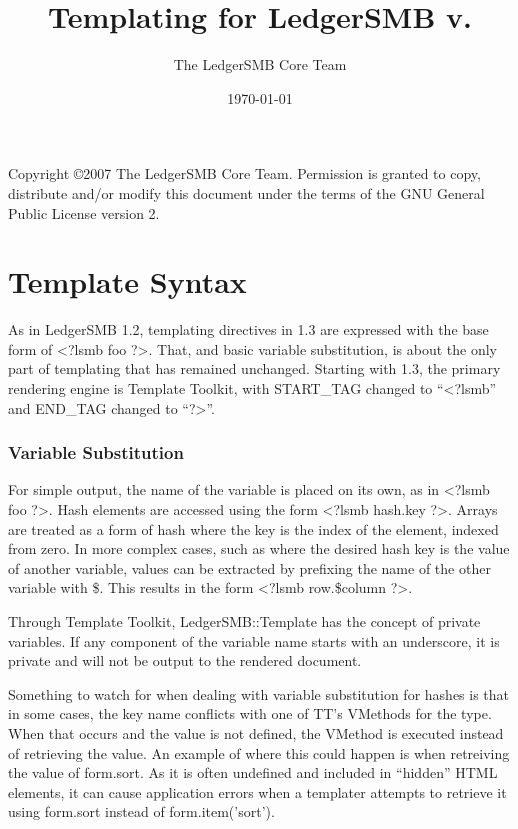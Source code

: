 \documentclass[english]{article}
\title{Templating for LedgerSMB v. \version}
\author{The LedgerSMB Core Team}
\date{\today}
\newcommand{\pitag}[1]{\textless?lsmb #1 ?\textgreater}
\newcommand{\version}{1.3}
\newcommand{\lsmb}{LedgerSMB }
\newcommand{\lsmbt}{LedgerSMB::Template}
\begin{document}
\maketitle
Copyright \copyright 2007 The LedgerSMB Core Team. Permission
is granted to copy, distribute and/or modify this document under the
terms of the GNU General Public License version 2.

\tableofcontents{}
\clearpage

\part{Template Syntax}

As in \lsmb 1.2, templating directives in \version{ }are expressed with the base
form of \pitag{foo}.  That, and basic variable substitution, is about the only
part of templating that has remained unchanged.  Starting with 1.3, the primary
rendering engine is Template Toolkit, with START\_TAG changed to
``\textless?lsmb'' and END\_TAG changed to ``?\textgreater''.

\section{Variable Substitution}
For simple output, the name of the variable is placed on its own, as in
\pitag{foo}.  Hash elements are accessed using the form \pitag{hash.key}. 
Arrays are treated as a form of hash where the key is the index of the element,
indexed from zero.  In more complex cases, such as where the desired hash key
is the value of another variable, values can be extracted by prefixing the name
of the other variable with \$.  This results in the form \pitag{row.\$column}.

Through Template Toolkit, \lsmbt{ }has the concept of private variables.  If
any component of the variable name starts with an underscore, it is private and
will not be output to the rendered document.

Something to watch for when dealing with variable substitution for hashes is
that in some cases, the key name conflicts with one of TT's VMethods for the
type.  When that occurs and the value is not defined, the VMethod is executed
instead of retrieving the value.  An example of where this could happen is when
retreiving the value of form.sort.  As it is often undefined and included in
``hidden'' HTML elements, it can cause application errors when a templater
attempts to retrieve it using form.sort instead of form.item('sort').
\end{document}
